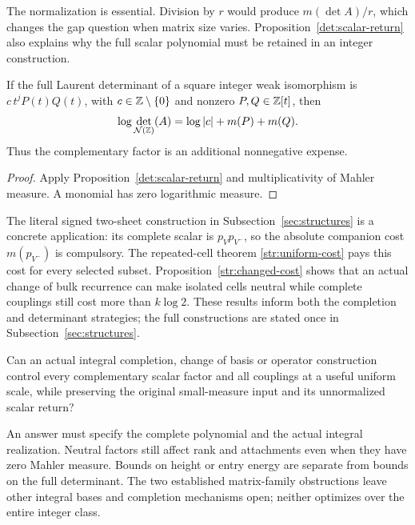 The normalization is essential.
Division by $r$ would produce $m(\det A)/r$, which changes the gap question when matrix size varies.
Proposition~\ref{det:scalar-return} also explains why the full scalar polynomial must be retained in an integer construction.

\begin{corollary}\label{det:full-cost}
If the full Laurent determinant of a square integer weak isomorphism is $c\,t^jP(t)Q(t)$, with $c\in\mathbb Z\setminus\{0\}$ and nonzero $P,Q\in\mathbb Z[t]$, then
\[
 \log\det_{\mathcal N(\mathbb Z)}(A)
   =\log|c|+m(P)+m(Q).
\]
Thus the complementary factor is an additional nonnegative expense.
\end{corollary}
\begin{proof}
Apply Proposition~\ref{det:scalar-return} and multiplicativity of Mahler measure.
A monomial has zero logarithmic measure.
\end{proof}

The literal signed two-sheet construction in Subsection~\ref{sec:structures} is a concrete application: its complete scalar is $p_Vp_{V^-}$, so the absolute companion cost $m(p_{V^-})$ is compulsory.
The repeated-cell theorem \ref{str:uniform-cost} pays this cost for every selected subset.
Proposition~\ref{str:changed-cost} shows that an actual change of bulk recurrence can make isolated cells neutral while complete couplings still cost more than $k\log2$.
These results inform both the completion and determinant strategies; the full constructions are stated once in Subsection~\ref{sec:structures}.

\begin{question}\label{det:completion-question}
Can an actual integral completion, change of basis or operator construction control every complementary scalar factor and all couplings at a useful uniform scale, while preserving the original small-measure input and its unnormalized scalar return?
\end{question}
An answer must specify the complete polynomial and the actual integral realization.
Neutral factors still affect rank and attachments even when they have zero Mahler measure.
Bounds on height or entry energy are separate from bounds on the full determinant.
The two established matrix-family obstructions leave other integral bases and completion mechanisms open; neither optimizes over the entire integer class.

